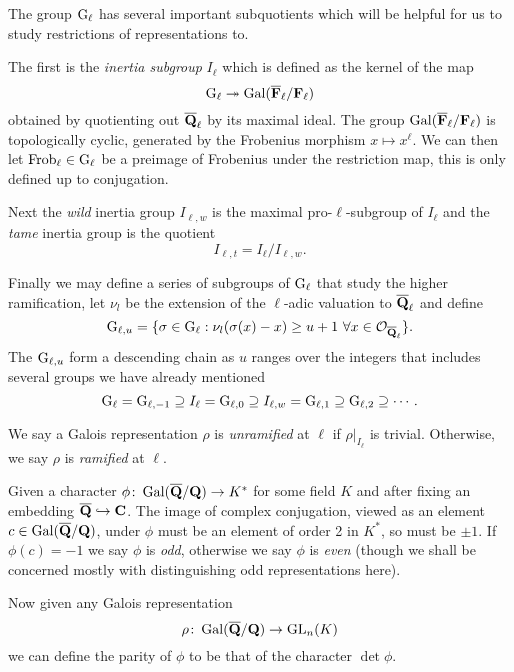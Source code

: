 \documentclass[a4paper,12pt]{article}
\begin{document}
The group $\mathrm{G}_\ell$ has several important subquotients which will be helpful for us to study restrictions of representations to.
\begin{defn}\label{defn-inert}
The first is the \emph{inertia subgroup} $I_\ell$ which is defined as the kernel of the map
\[
\mathrm{G}_\ell \twoheadrightarrow \operatorname{Gal}(\overline{\mathbf{F}}_\ell/\mathbf{F}_\ell)
\]
obtained by quotienting out $\overline{\mathbf{Q}}_\ell$ by its maximal ideal.
The group $\operatorname{Gal}(\overline{\mathbf{F}}_\ell/\mathbf{F}_\ell)$ is topologically cyclic, generated by the Frobenius morphism $x \mapsto x^\ell$.
We can then let $\operatorname{Frob}_\ell\in \mathrm{G}_\ell$ be a preimage of Frobenius under the restriction map, this is only defined up to conjugation.


Next the \emph{wild} inertia group $I_{\ell,w}$ is the maximal pro-$\ell$-subgroup of $I_\ell$ and the \emph{tame} inertia group is the quotient
\[
I_{\ell,t} = I_\ell / I_{\ell,w}.
\]

Finally we may define a series of subgroups of $\mathrm{G}_\ell$ that study the higher ramification, let $\nu_l$ be the extension of the $\ell$-adic valuation to $\overline{\mathbf{Q}}_\ell$ and define
\[
\mathrm{G}_{\ell,u} = \{\sigma \in \mathrm{G}_\ell : \nu_l(\sigma(x) - x) \ge u + 1\ \forall x \in \mathcal{O}_{\overline{\mathbf{Q}}_\ell} \}.
\]
The $\mathrm{G}_{\ell,u}$ form a descending chain as $u$ ranges over the integers that includes several groups we have already mentioned
\[
\mathrm{G}_\ell = \mathrm{G}_{\ell,-1} \supseteq I_\ell = \mathrm{G}_{\ell,0} \supseteq  I_{\ell,w} = \mathrm{G}_{\ell,1} \supseteq\mathrm{G}_{\ell, 2}\supseteq\cdots.
\]
\end{defn}

\begin{defn}
We say a Galois representation $\rho$ is \emph{unramified} at $\ell$ if $\rho|_{I_\ell}$ is trivial.
Otherwise, we say $\rho$ is \emph{ramified} at $\ell$.
\end{defn}

\begin{defn}
Given a character $\phi\colon\operatorname{Gal}(\overline{\mathbf{Q}}/\mathbf{Q}) \to K^*$ for some field $K$ and after fixing an embedding $\overline{\mathbf{Q}}\hookrightarrow \mathbf{C}$.
The image of complex conjugation, viewed as an element $c\in \operatorname{Gal}(\overline{\mathbf{Q}}/\mathbf{Q})$, under $\phi$ must be an element of order 2 in $K^*$, so must be $\pm 1$.
If $\phi(c) = -1$ we say $\phi$ is \emph{odd}, otherwise we say $\phi$  is \emph{even} (though we shall be concerned mostly with distinguishing odd representations here).

Now given any Galois representation
\[
\rho\colon\operatorname{Gal}(\overline{\mathbf{Q}}/\mathbf{Q}) \to \operatorname{GL}_n(K)
\]
we can define the parity of $\phi$ to be that of the character $\det\phi$.
\end{defn}
\end{document}
